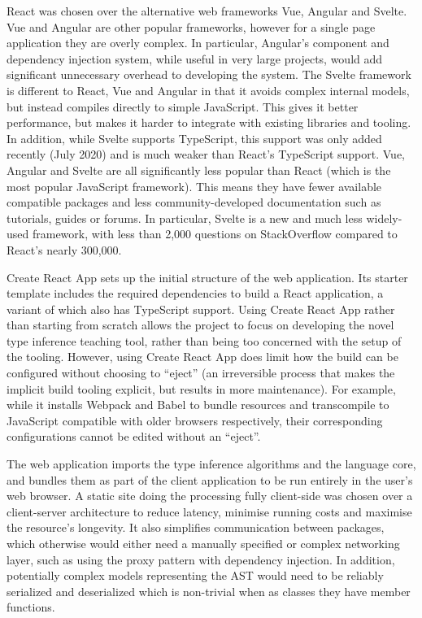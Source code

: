 \documentclass[a4paper,fleqn,oneside,12pt]{report}
\begin{document}
React was chosen over the alternative web frameworks Vue, Angular and Svelte. Vue and Angular are other popular frameworks, however for a single page application they are overly complex. In particular, Angular's component and dependency injection system, while useful in very large projects, would add significant unnecessary overhead to developing the system. The Svelte framework is different to React, Vue and Angular in that it avoids complex internal models, but instead compiles directly to simple JavaScript. This gives it better performance, but makes it harder to integrate with existing libraries and tooling. In addition, while Svelte supports TypeScript, this support was only added recently (July 2020) and is much weaker than React’s TypeScript support. Vue, Angular and Svelte are all significantly less popular than React (which is the most popular JavaScript framework). This means they have fewer available compatible packages and less community-developed documentation such as tutorials, guides or forums. In particular, Svelte is a new and much less widely-used framework, with less than 2,000 questions on StackOverflow compared to React’s nearly 300,000.

Create React App sets up the initial structure of the web application. Its starter template includes the required dependencies to build a React application, a variant of which also has TypeScript support. Using Create React App rather than starting from scratch allows the project to focus on developing the novel type inference teaching tool, rather than being too concerned with the setup of the tooling. However, using Create React App does limit how the build can be configured without choosing to ``eject'' (an irreversible process that makes the implicit build tooling explicit, but results in more maintenance). For example, while it installs Webpack and Babel to bundle resources and transcompile to JavaScript compatible with older browsers respectively, their corresponding configurations cannot be edited without an ``eject''.

The web application imports the type inference algorithms and the language core, and bundles them as part of the client application to be run entirely in the user’s web browser. A static site doing the processing fully client-side was chosen over a client-server architecture to reduce latency, minimise running costs and maximise the resource’s longevity. It also simplifies communication between packages, which otherwise would either need a manually specified or complex networking layer, such as using the proxy pattern with dependency injection. In addition, potentially complex models representing the AST would need to be reliably serialized and deserialized which is non-trivial when as classes they have member functions.
\end{document}
